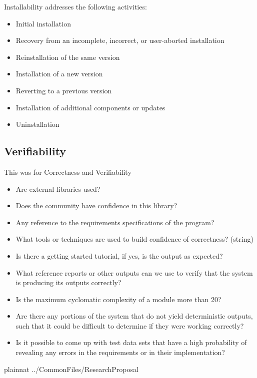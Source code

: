 \documentclass{article}
\begin{document}
Installability addresses the following activities:
\begin{itemize}

\item Initial installation
\item Recovery from an incomplete, incorrect, or user-aborted installation
\item Reinstallation of the same version
\item Installation of a new version
\item Reverting to a previous version
\item Installation of additional components or updates
\item Uninstallation
\end{itemize}

\subsection{Verifiability}

\citep{SmithEtAl2018}
This was for Correctness and Verifiability
\begin{itemize}
	\item Are external libraries used? 
	\item Does the community have confidence in this library? 
	\item Any reference to the requirements specifications of the program?
	\item What tools or techniques are used to build confidence of correctness? (string)
	\item Is there a getting started tutorial, if yes, is the output as expected?
\end{itemize}
\citep{wiegers2003softreq}
\begin{itemize}
	\item What reference reports or other outputs can we use to verify that the system is producing its outputs correctly?
	\item Is the maximum cyclomatic complexity of a module more than 20?
	\item Are there any portions of the system that do not yield deterministic outputs, such that it could be difficult to determine if they were working correctly?
	\item Is it possible to come up with test data sets that have a high probability of revealing any errors in the requirements or in their implementation?
\end{itemize}


 {plainnat}
 {../CommonFiles/ResearchProposal}
\end{document}
